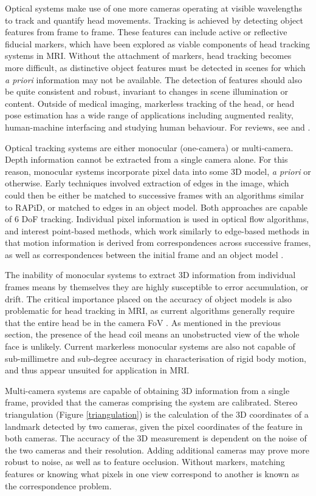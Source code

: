 \documentclass[class=article, crop=false]{standalone}
\begin{document}
Optical systems make use of one more cameras operating at visible wavelengths to track and quantify head movements. Tracking is achieved by detecting object features from frame to frame. These features can include active or reflective fiducial markers, which have been explored as viable components of head tracking systems in MRI. Without the attachment of markers, head tracking becomes more difficult, as distinctive object features must be detected in scenes for which \textit{a priori} information may not be available. The detection of features should also be quite consistent and robust, invariant to changes in scene illumination or content. Outside of medical imaging, markerless tracking of the head, or head pose estimation has a wide range of applications including augmented reality, human-machine interfacing and studying human behaviour. For reviews, see \cite{Murphy-Chutorian2009} and \cite{Lepetit2005}.
\par
Optical tracking systems are either monocular (one-camera) or multi-camera. Depth information cannot be extracted from a single camera alone. For this reason, monocular systems incorporate pixel data into some 3D model, \textit{a priori} or otherwise. Early techniques involved extraction of edges in the image, which could then be either be matched to successive frames with an algorithms similar to RAPiD, or matched to edges in an object model. Both approaches are capable of 6 DoF tracking. Individual pixel information is used in optical flow algorithms, and interest point-based methods, which work similarly to edge-based methods in that motion information is derived from correspondences across successive frames, as well as correspondences between the initial frame and an object model \parencite{Ravela1995}.
\par  
The inability of monocular systems to extract 3D information from individual frames means by themselves they are highly susceptible to error accumulation, or drift. The critical importance placed on the accuracy of object models is also problematic for head tracking in MRI, as current algorithms generally require that the entire head be in the camera FoV \parencite{Jeni2017a,Jourabloo2016,Zhu2016,Dong2016,Gu2006}. As mentioned in the previous section, the presence of the head coil means an unobstructed view of the whole face is unlikely. Current markerless monocular systems are also not capable of sub-millimetre and sub-degree accuracy in characterisation of rigid body motion, and thus appear unsuited for application in MRI.
\par
Multi-camera systems are capable of obtaining 3D information from a single frame, provided that the cameras comprising the system are calibrated. Stereo triangulation (Figure \ref{triangulation}) is the calculation of the 3D coordinates of a landmark detected by two cameras, given the pixel coordinates of the feature in both cameras. The accuracy of the 3D measurement is dependent on the noise of the two cameras and their resolution. Adding additional cameras may prove more robust to noise, as well as to feature occlusion. Without markers, matching features or knowing what pixels in one view correspond to another is known as the correspondence problem.
\end{document}

